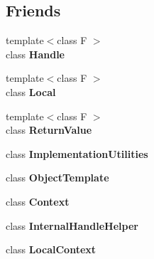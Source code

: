 \subsection*{Friends}
\begin{DoxyCompactItemize}
\item 
\hypertarget{classv8_1_1_persistent_a67ca1a2d91273eaf85fb3d23ba8ce984}{}{\footnotesize template$<$class F $>$ }\\class {\bfseries Handle}\label{classv8_1_1_persistent_a67ca1a2d91273eaf85fb3d23ba8ce984}

\item 
\hypertarget{classv8_1_1_persistent_afb872edb4aac7ba55f0da004113aa2b0}{}{\footnotesize template$<$class F $>$ }\\class {\bfseries Local}\label{classv8_1_1_persistent_afb872edb4aac7ba55f0da004113aa2b0}

\item 
\hypertarget{classv8_1_1_persistent_a53f604d3d6f2dc0647df33c9979f116a}{}{\footnotesize template$<$class F $>$ }\\class {\bfseries Return\+Value}\label{classv8_1_1_persistent_a53f604d3d6f2dc0647df33c9979f116a}

\item 
\hypertarget{classv8_1_1_persistent_ac7b520085953e146d849e05253267f72}{}class {\bfseries Implementation\+Utilities}\label{classv8_1_1_persistent_ac7b520085953e146d849e05253267f72}

\item 
\hypertarget{classv8_1_1_persistent_a4d28646409234f556983be8a96c06424}{}class {\bfseries Object\+Template}\label{classv8_1_1_persistent_a4d28646409234f556983be8a96c06424}

\item 
\hypertarget{classv8_1_1_persistent_ac26c806e60ca4a0547680edb68f6e39b}{}class {\bfseries Context}\label{classv8_1_1_persistent_ac26c806e60ca4a0547680edb68f6e39b}

\item 
\hypertarget{classv8_1_1_persistent_a4d886c8e6d4c47ae9d59f6d878048580}{}class {\bfseries Internal\+Handle\+Helper}\label{classv8_1_1_persistent_a4d886c8e6d4c47ae9d59f6d878048580}

\item 
\hypertarget{classv8_1_1_persistent_ae34f528093f2fad464ce37f6e64c763d}{}class {\bfseries Local\+Context}\label{classv8_1_1_persistent_ae34f528093f2fad464ce37f6e64c763d}

\end{DoxyCompactItemize}


